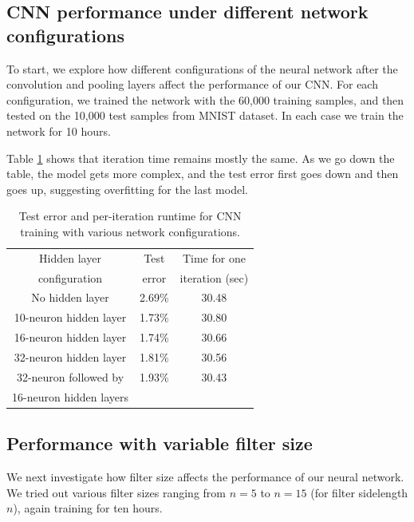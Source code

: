\documentclass[10pt,twocolumn]{article}
\begin{document}
\subsection{CNN performance under different network configurations}

To start, we explore how different configurations of the neural network after the convolution and pooling layers affect the performance of our CNN. For each configuration, we trained the network with the 60,000 training samples, and then tested on the 10,000 test samples from MNIST dataset. In each case we train the network for 10 hours.

Table \ref{table:change_in_neurons_in_hidden_layer} shows that iteration time remains mostly the same. As we go down the table, the model gets more complex, and the test error first goes down and then goes up, suggesting overfitting for the last model.

\begin{table}
\begin{center}
\begin{tabular}{| c | c | c |}
\hline
Hidden layer & Test & Time for one \\
configuration & error & iteration (sec) \\
\hline \hline
No hidden layer & 2.69\% & 30.48 \\
\hline
10-neuron hidden layer & 1.73\% & 30.80 \\
\hline
16-neuron hidden layer & 1.74\% & 30.66 \\
\hline
32-neuron hidden layer & 1.81\% & 30.56 \\
\hline
32-neuron followed by & 1.93\% & 30.43 \\
16-neuron hidden layers & & \\
\hline
\end{tabular}
\end{center}
\caption{Test error and per-iteration runtime for CNN training with various network configurations.}
\label{table:change_in_neurons_in_hidden_layer}
\end{table}

\subsection{Performance with variable filter size}

We next investigate how filter size affects the performance of our neural network. We tried out various filter sizes ranging from $n = 5$ to $n = 15$ (for filter sidelength $n$), again training for ten hours.
\end{document}
